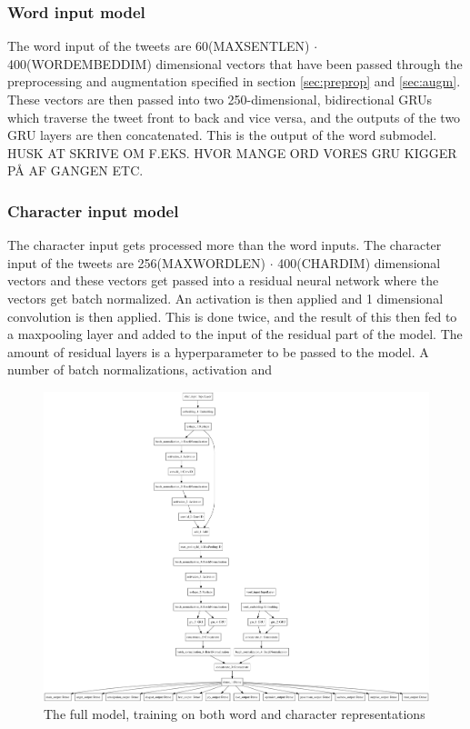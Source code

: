 \subsubsection{Word input model}
The word input of the tweets are 60(MAXSENTLEN) $\cdot$ 400(WORDEMBEDDIM) dimensional vectors that have been passed through the preprocessing and augmentation specified in section \ref{sec:preprop} and \ref{sec:augm}. These vectors are then passed into two 250-dimensional, bidirectional GRUs which traverse the tweet front to back and vice versa, and the outputs of the two GRU layers are then concatenated. This is the output of the word submodel.\\
HUSK AT SKRIVE OM F.EKS. HVOR MANGE ORD VORES GRU KIGGER PÅ AF GANGEN ETC.


\subsubsection{Character input model}
The character input gets processed more than the word inputs. The character input of the tweets are 256(MAXWORDLEN) $\cdot$ 400(CHARDIM) dimensional vectors and these vectors get passed into a residual neural network where the vectors get batch normalized. An activation is then applied and 1 dimensional convolution is then applied. This is done twice, and the result of this then fed to a maxpooling layer and added to the input of the residual part of the model. The amount of residual layers is a hyperparameter to be passed to the model. A number of batch normalizations, activation and
\begin{figure}[H]
    \centering
        \includegraphics[width=\textwidth]{pictures/model.png}
        \caption{The full model, training on both word and character representations}
        \label{fig:fullmodel}
\end{figure}


